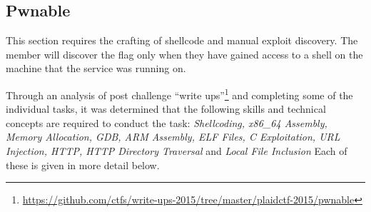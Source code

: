 \documentclass[twoside,a4paper,11pt]{report}
\begin{document}
		\subsection{Pwnable}
			This section requires the crafting of shellcode and manual exploit discovery. 
			The member will discover the flag only when they have gained access to a shell on the machine that the service was running on. 

			Through an analysis of post challenge ``write ups''\footnote{\url{https://github.com/ctfs/write-ups-2015/tree/master/plaidctf-2015/pwnable}}
			and completing some of the individual tasks, 
			it was determined that the following skills and technical concepts are required to conduct the task: 
			\textit{Shellcoding, x86\_64 Assembly, Memory Allocation, GDB, ARM Assembly, ELF Files, C Exploitation, URL Injection, HTTP, HTTP Directory Traversal} and \textit{Local File Inclusion}
			Each of these is given in more detail below. 
\end{document}
